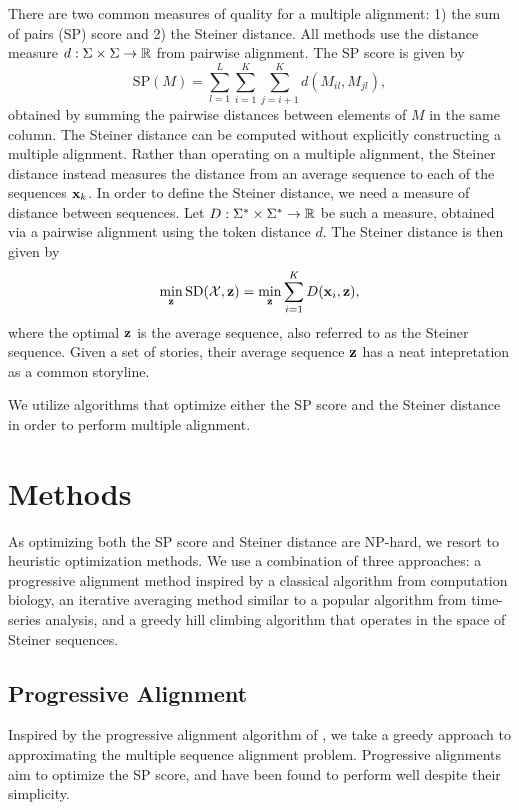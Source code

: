 \documentclass{article}
\begin{document}
There are two common measures of quality for a multiple alignment:
1) the sum of pairs (SP) score and 2) the Steiner distance.
All methods use the distance measure $d: \Sigma\times\Sigma\to\mathbb{R}$ from pairwise alignment.
The SP score is given by
\begin{equation}
\mathrm{SP}(M) = \sum_{l=1}^L \sum_{i=1}^K \sum_{j=i+1}^K d(M_{il}, M_{jl}),
\end{equation}
obtained by summing the pairwise distances between elements of $M$ in the same column.
The Steiner distance can be computed without explicitly constructing a multiple alignment.
Rather than operating on a multiple alignment, the Steiner distance instead
measures the distance from an average sequence to each of the sequences $\mathbf{x}_k$.
In order to define the Steiner distance, we need a measure of distance between sequences.
Let $D: \Sigma^* \times \Sigma^* \to \mathbb{R}$ be such a measure,
obtained via a pairwise alignment using the token distance $d$.
The Steiner distance is then given by
\begin{equation}
\min_{\mathbf{z}} \mathrm{SD}(\mathcal{X}, \mathbf{z}) = \min_{\mathbf{z}} \sum_{i=1}^K D(\mathbf{x}_i, \mathbf{z}),
\end{equation}
where the optimal $\mathbf{z}$ is the average sequence, also referred to as the Steiner sequence.
Given a set of stories, their average sequence $\mathbf{z}$ has a neat intepretation
as a common storyline.

We utilize algorithms that optimize either the SP score and the Steiner distance
in order to perform multiple alignment.

\section{Methods}
As optimizing both the SP score and Steiner distance are NP-hard,
we resort to heuristic optimization methods.
We use a combination of three approaches: a progressive alignment method
inspired by a classical algorithm from computation biology,
an iterative averaging method similar to a popular algorithm from time-series analysis,
and a greedy hill climbing algorithm that operates in the space of Steiner sequences.

\subsection{Progressive Alignment}
Inspired by the progressive alignment algorithm
of \citet{fengdoolittle}, we take a greedy approach to approximating
the multiple sequence alignment problem.
Progressive alignments aim to optimize the SP score,
and have been found to perform well despite their simplicity.
\end{document}
